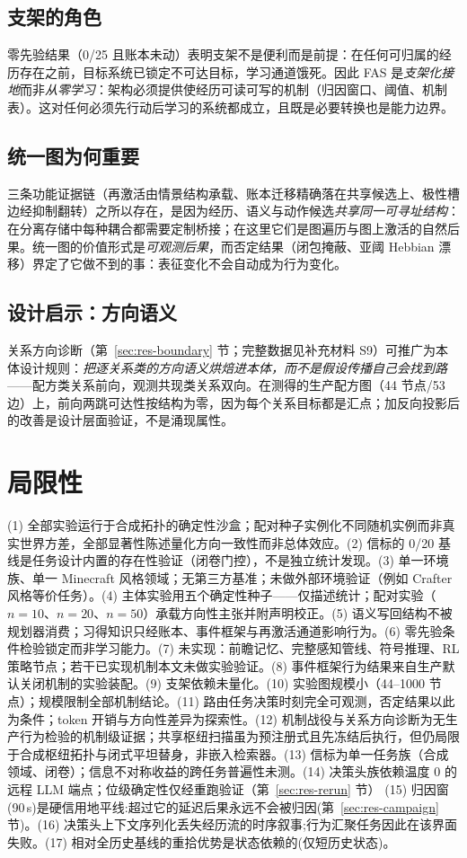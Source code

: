 \documentclass[10pt,a4paper]{ctexart}
\begin{document}
\subsection{支架的角色}
零先验结果（0/25 且账本未动）表明支架不是便利而是前提：在任何可归属的经历存在之前，目标系统已锁定不可达目标，学习通道饿死。因此 FAS 是\emph{支架化接地}而非\emph{从零学习}：架构必须提供使经历可读可写的机制（归因窗口、阈值、机制表）。这对任何必须先行动后学习的系统都成立，且既是必要转换也是能力边界。

\subsection{统一图为何重要}
三条功能证据链（再激活由情景结构承载、账本迁移精确落在共享候选上、极性槽边经抑制翻转）之所以存在，是因为经历、语义与动作候选\emph{共享同一可寻址结构}：在分离存储中每种耦合都需要定制桥接；在这里它们是图遍历与图上激活的自然后果。统一图的价值形式是\emph{可观测后果}，而否定结果（闭包掩蔽、亚阈 Hebbian 漂移）界定了它做不到的事：表征变化不会自动成为行为变化。

\subsection{设计启示：方向语义}
关系方向诊断（第~\ref{sec:res-boundary} 节；完整数据见补充材料 S9）可推广为本体设计规则：\emph{把逐关系类的方向语义烘焙进本体，而不是假设传播自己会找到路}——配方类关系前向，观测共现类关系双向。在测得的生产配方图（44 节点/53 边）上，前向两跳可达性按结构为零，因为每个关系目标都是汇点；加反向投影后的改善是设计层面验证，不是涌现属性。

\section{局限性}
\label{sec:limits}
(1) 全部实验运行于合成拓扑的确定性沙盒；配对种子实例化不同随机实例而非真实世界方差，全部显著性陈述量化方向一致性而非总体效应。(2) 信标的 0/20 基线是任务设计内置的存在性验证（闭卷门控），不是独立统计发现。(3) 单一环境族、单一 Minecraft 风格领域；无第三方基准；未做外部环境验证（例如 Crafter 风格等价任务）。(4) 主体实验用五个确定性种子——仅描述统计；配对实验（$n{=}10$、$n{=}20$、$n{=}50$）承载方向性主张并附声明校正。(5) 语义写回结构不被规划器消费；习得知识只经账本、事件框架与再激活通道影响行为。(6) 零先验条件检验锁定而非学习能力。(7) 未实现：前瞻记忆、完整感知管线、符号推理、RL 策略节点；若干已实现机制本文未做实验验证。(8) 事件框架行为结果来自生产默认关闭机制的实验装配。(9) 支架依赖未量化。(10) 实验图规模小（44--1000 节点）；规模限制全部机制结论。(11) 路由任务决策时刻完全可观测，否定结果以此为条件；token 开销与方向性差异为探索性。(12) 机制战役与关系方向诊断为无生产行为检验的机制级证据；共享枢纽扫描虽为预注册式且先冻结后执行，但仍局限于合成枢纽拓扑与闭式平坦替身，非嵌入检索器。(13) 信标为单一任务族（合成领域、闭卷）；信息不对称收益的跨任务普遍性未测。(14) 决策头族依赖温度 0 的远程 LLM 端点；位级确定性仅经重跑验证（第~\ref{sec:res-rerun} 节） (15) 归因窗(90\,s)是硬信用地平线:超过它的延迟后果永远不会被归因(第~\ref{sec:res-campaign} 节)。(16) 决策头上下文序列化丢失经历流的时序叙事;行为汇聚任务因此在该界面失败。(17) 相对全历史基线的重拾优势是状态依赖的(仅短历史状态)。
\end{document}
